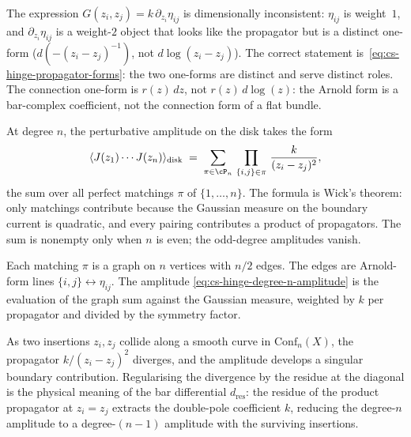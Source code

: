 \begin{remark}
\label{rem:cs-hinge-propagator-arnold-distinction}
The expression
$G(z_i, z_j) = k\,\partial_{z_i}\eta_{ij}$ is dimensionally
inconsistent: $\eta_{ij}$ is weight~$1$, and
$\partial_{z_i}\eta_{ij}$ is a weight-$2$ object that looks like
the propagator but is a distinct one-form
($d(-(z_i - z_j)^{-1})$, not $d\log(z_i - z_j)$). The correct
statement is~\eqref{eq:cs-hinge-propagator-forms}: the two
one-forms are distinct and serve distinct roles. The connection
one-form is $r(z)\,dz$, not $r(z)\,d\log(z)$: the Arnold form is a
bar-complex coefficient,
not the connection form of a flat bundle.
\end{remark}

At degree $n$, the perturbative amplitude on the disk takes the form
\begin{equation}\label{eq:cs-hinge-degree-n-amplitude}
\langle J(z_1)\cdots J(z_n)\rangle_{\mathrm{disk}}
\;=\;
\sum_{\pi \in \cP_n}\,
\prod_{\{i,j\} \in \pi}\,
\frac{k}{(z_i - z_j)^2},
\end{equation}
the sum over all perfect matchings $\pi$ of $\{1, \ldots, n\}$.
The formula is Wick's theorem: only matchings contribute because
the Gaussian measure on the boundary current is quadratic, and
every pairing contributes a product of propagators. The sum
is nonempty only when $n$ is even; the odd-degree amplitudes
vanish.

Each matching $\pi$ is a graph on $n$ vertices with $n/2$ edges.
The edges are Arnold-form lines
$\{i,j\}\leftrightarrow\eta_{ij}$. The amplitude
\eqref{eq:cs-hinge-degree-n-amplitude} is the evaluation of the
graph sum against the Gaussian measure, weighted by $k$ per
propagator and divided by the symmetry factor.

\begin{heuristic}
\label{heur:cs-hinge-collision-bar}
As two insertions $z_i, z_j$ collide along a smooth curve in
$\mathrm{Conf}_n(X)$, the propagator
$k/(z_i - z_j)^2$ diverges, and the amplitude develops a singular
boundary contribution. Regularising the divergence by the
residue at the diagonal is the physical meaning of the bar
differential $d_{\mathrm{res}}$: the residue of the product
propagator at $z_i = z_j$ extracts the double-pole coefficient
$k$, reducing the degree-$n$ amplitude to a degree-$(n-1)$
amplitude with the surviving insertions.
\end{heuristic}

